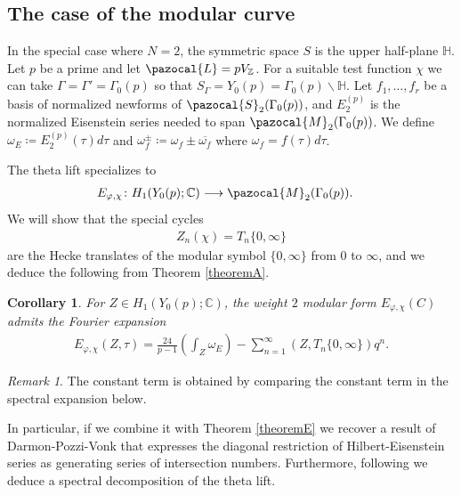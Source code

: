 \documentclass[a4paper,11pt]{amsart} %
\newcommand{\8}{\infty}
\newcommand{\Z}{\mathbb{Z}}
\newcommand{\HH}{\mathbb{H}}
\newcommand{\C}{\mathbb{C}}
\newcommand{\Scal}{\pazocal{S}}
\newcommand{\Lcal}{\pazocal{L}}
\newcommand{\Mcal}{\pazocal{M}}
\theoremstyle{mytheoremstyle}
\newtheorem{cor}{Corollary}[thm]
\theoremstyle{remark}
\newtheorem{rmk}{Remark}[section]
\numberwithin{equation}{section}
\begin{document}
\subsection{The case of the modular curve} \label{intro modular curve} In the special case where $N=2$, the symmetric space $S$ is the upper half-plane $\HH$. Let $p$ be a prime and let $\Lcal=pV_\Z$. For a suitable test function $\chi$ we can take $\Gamma=\Gamma'=\Gamma_0(p)$ so that $S_\Gamma = Y_0(p)= \Gamma_0(p) \backslash \HH$. Let $f_1, \dots,f_r$ be a basis of normalized newforms of $\Scal_2(\Gamma_0(p))$, and $E_2^{(p)}$ is the normalized Eisenstein series needed to span $\Mcal_2(\Gamma_0(p))$.
We define $\omega_E \coloneqq E_2^{(p)}(\tau)d\tau$ and $\omega^{\pm}_f \coloneqq \omega_{f} \pm \overline{\omega_{f}}$ where $\omega_{f}=f(\tau)d\tau$.

The theta lift specializes to
\begin{align} \label{lift118}
E_{\varphi, \chi} \colon H_{1}(Y_0(p);\C)& \longrightarrow \Mcal_2(\Gamma_0(p)).
\end{align}
We will show that the special cycles 
\begin{align}
Z_n(\chi)=T_n\{0,\8\}
\end{align} are the Hecke translates of the modular symbol $\{0,\8\}$ from $0$ to $\8$, and we deduce the following from Theorem \ref{theoremA}.
\begin{cor} For $Z \in H_1(Y_0(p);\C)$, the weight $2$ modular form $E_{\varphi, \chi}(C)$ admits the Fourier expansion
\begin{align}
E_{\varphi, \chi}(Z,\tau) = \frac{24}{p-1} \left ( \int_Z \omega_E \right )-\sum_{n=1}^\8 (Z,T_n\{0,\8\})q^n.
\end{align}
\end{cor}
\begin{rmk} The constant term is obtained by comparing the constant term in the spectral expansion below.
\end{rmk}
In particular, if we combine it with Theorem \ref{theoremE} we recover a result of Darmon-Pozzi-Vonk\cite[Theorem.~A]{dpv} that expresses the diagonal restriction of Hilbert-Eisenstein series as generating series of intersection numbers. Furthermore, following \cite{dpv} we deduce a spectral decomposition of the theta lift. 
\end{document}
